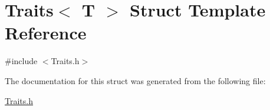 \hypertarget{struct_traits}{}\section{Traits$<$ T $>$ Struct Template Reference}
\label{struct_traits}


{\ttfamily \#include $<$Traits.\+h$>$}



The documentation for this struct was generated from the following file\+:\begin{DoxyCompactItemize}
\item 
\hyperlink{_traits_8h}{Traits.\+h}\end{DoxyCompactItemize}
